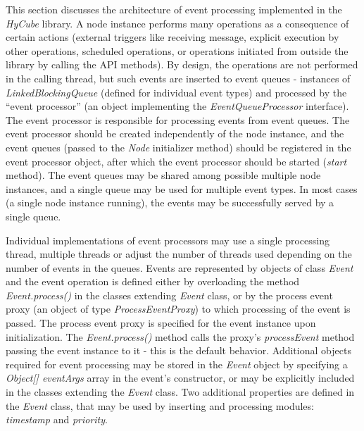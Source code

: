 This section discusses the architecture of event processing implemented in the \emph{HyCube} library. A node instance performs many operations as a consequence of certain actions (external triggers like receiving message, explicit execution by other operations, scheduled operations, or operations initiated from outside the library by calling the API methods). By design, the operations are not performed in the calling thread, but such events are inserted to event queues - instances of \emph{LinkedBlockingQueue} (defined for individual event types) and processed by the ``event processor'' (an object implementing the \emph{EventQueueProcessor} interface). The event processor is responsible for processing events from event queues. The event processor should be created independently of the node instance, and the event queues (passed to the \emph{Node} initializer method) should be registered in the event processor object, after which the event processor should be started (\emph{start} method). The event queues may be shared among possible multiple node instances, and a single queue may be used for multiple event types. In most cases (a single node instance running), the events may be successfully served by a single queue.

Individual implementations of event processors may use a single processing thread, multiple threads or adjust the number of threads used depending on the number of events in the queues. Events are represented by objects of class \emph{Event} and the event operation is defined either by overloading the method \emph{Event.process()} in the classes extending \emph{Event} class, or by the process event proxy (an object of type \emph{ProcessEventProxy}) to which processing of the event is passed. The process event proxy is specified for the event instance upon initialization. The \emph{Event.process()} method calls the proxy's \emph{processEvent} method passing the event instance to it - this is the default behavior. Additional objects required for event processing may be stored in the \emph{Event} object by specifying a \emph{Object[] eventArgs} array in the event's constructor, or may be explicitly included in the classes extending the \emph{Event} class. Two additional properties are defined in the \emph{Event} class, that may be used by inserting and processing modules: \emph{timestamp} and \emph{priority}.


